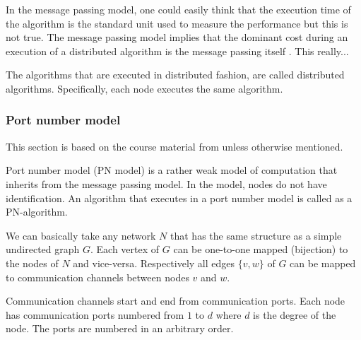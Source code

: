 In the message passing model, one could easily think that the execution time of the algorithm is the standard unit used to measure the performance but this is not true.
The message passing model implies that the dominant cost during an execution of a distributed algorithm is the message passing itself
\cite{DBLP:books/el/leeuwen90/LamportL90}.
This really... 






The algorithms that are executed in distributed fashion, are called distributed algorithms.
Specifically, each node executes the same algorithm.



\subsubsection{Port number model} \label{sec:port_number_model}
This section is based on the course material from \cite{HirvonenSuomelaDistAlg2020} unless otherwise mentioned.

Port number model (PN model) is a rather weak model of computation that inherits from the message passing model.
In the model, nodes do not have identification.
An algorithm that executes in a port number model is called as a PN-algorithm.

We can basically take any network $N$ that has the same structure as a simple undirected graph $G$.
Each vertex of $G$ can be one-to-one mapped (bijection) to the nodes of $N$ and vice-versa.
Respectively all edges $\{v, w\}$ of $G$ can be mapped to communication channels between nodes $v$ and $w$.

Communication channels start and end from communication ports.
Each node has communication ports numbered from $1$ to $d$ where $d$ is the degree of the node.
The ports are numbered in an arbitrary order.

